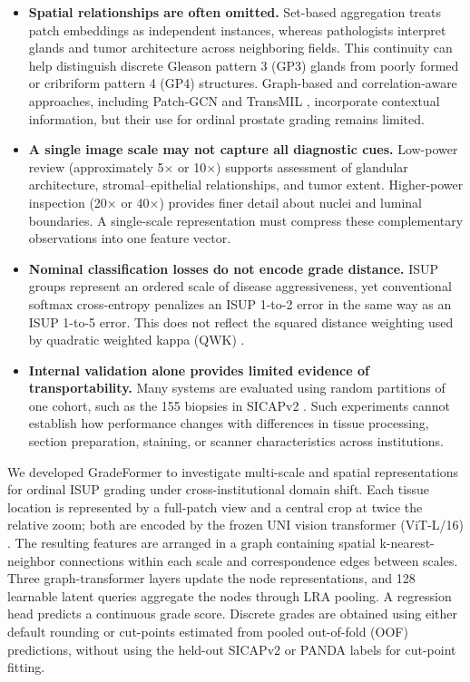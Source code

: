 \documentclass[11pt,a4paper]{article}
\begin{document}
\begin{itemize}[leftmargin=1.8em, itemsep=3pt, parsep=0pt]
  \item \textbf{Spatial relationships are often omitted.} Set-based aggregation treats patch embeddings as independent instances, whereas pathologists interpret glands and tumor architecture across neighboring fields. This continuity can help distinguish discrete Gleason pattern 3 (GP3) glands from poorly formed or cribriform pattern 4 (GP4) structures. Graph-based and correlation-aware approaches, including Patch-GCN \cite{ref9} and TransMIL \cite{ref10}, incorporate contextual information, but their use for ordinal prostate grading remains limited.
  \item \textbf{A single image scale may not capture all diagnostic cues.} Low-power review (approximately 5$\times$ or 10$\times$) supports assessment of glandular architecture, stromal--epithelial relationships, and tumor extent. Higher-power inspection (20$\times$ or 40$\times$) provides finer detail about nuclei and luminal boundaries. A single-scale representation must compress these complementary observations into one feature vector.
  \item \textbf{Nominal classification losses do not encode grade distance.} ISUP groups represent an ordered scale of disease aggressiveness, yet conventional softmax cross-entropy penalizes an ISUP 1-to-2 error in the same way as an ISUP 1-to-5 error. This does not reflect the squared distance weighting used by quadratic weighted kappa (QWK) \cite{ref11}.
  \item \textbf{Internal validation alone provides limited evidence of transportability.} Many systems are evaluated using random partitions of one cohort, such as the 155 biopsies in SICAPv2 \cite{ref12}. Such experiments cannot establish how performance changes with differences in tissue processing, section preparation, staining, or scanner characteristics across institutions.
\end{itemize}

We developed GradeFormer to investigate multi-scale and spatial representations for ordinal ISUP grading under cross-institutional domain shift. Each tissue location is represented by a full-patch view and a central crop at twice the relative zoom; both are encoded by the frozen UNI vision transformer (ViT-L/16) \cite{ref13}. The resulting features are arranged in a graph containing spatial k-nearest-neighbor connections within each scale and correspondence edges between scales. Three graph-transformer layers update the node representations, and 128 learnable latent queries aggregate the nodes through LRA pooling. A regression head predicts a continuous grade score. Discrete grades are obtained using either default rounding or cut-points estimated from pooled out-of-fold (OOF) predictions, without using the held-out SICAPv2 or PANDA labels for cut-point fitting.
\end{document}
